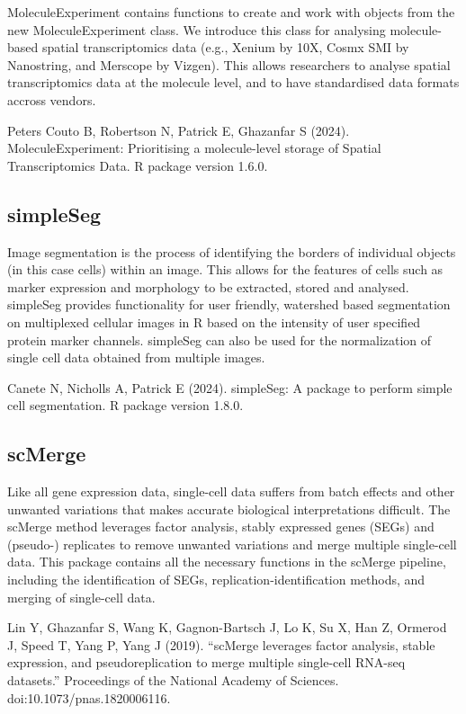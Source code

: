 \documentclass[
  letterpaper,
  DIV=11,
  numbers=noendperiod]{scrreprt}
\begin{document}
MoleculeExperiment contains functions to create and work with objects
from the new MoleculeExperiment class. We introduce this class for
analysing molecule-based spatial transcriptomics data (e.g., Xenium by
10X, Cosmx SMI by Nanostring, and Merscope by Vizgen). This allows
researchers to analyse spatial transcriptomics data at the molecule
level, and to have standardised data formats accross vendors.

Peters Couto B, Robertson N, Patrick E, Ghazanfar S (2024).
MoleculeExperiment: Prioritising a molecule-level storage of Spatial
Transcriptomics Data. R package version 1.6.0.

\subsection*{simpleSeg}\label{simpleseg}

Image segmentation is the process of identifying the borders of
individual objects (in this case cells) within an image. This allows for
the features of cells such as marker expression and morphology to be
extracted, stored and analysed. simpleSeg provides functionality for
user friendly, watershed based segmentation on multiplexed cellular
images in R based on the intensity of user specified protein marker
channels. simpleSeg can also be used for the normalization of single
cell data obtained from multiple images.

Canete N, Nicholls A, Patrick E (2024). simpleSeg: A package to perform
simple cell segmentation. R package version 1.8.0.

\subsection*{scMerge}\label{scmerge}

Like all gene expression data, single-cell data suffers from batch
effects and other unwanted variations that makes accurate biological
interpretations difficult. The scMerge method leverages factor analysis,
stably expressed genes (SEGs) and (pseudo-) replicates to remove
unwanted variations and merge multiple single-cell data. This package
contains all the necessary functions in the scMerge pipeline, including
the identification of SEGs, replication-identification methods, and
merging of single-cell data.

Lin Y, Ghazanfar S, Wang K, Gagnon-Bartsch J, Lo K, Su X, Han Z, Ormerod
J, Speed T, Yang P, Yang J (2019). ``scMerge leverages factor analysis,
stable expression, and pseudoreplication to merge multiple single-cell
RNA-seq datasets.'' Proceedings of the National Academy of Sciences.
doi:10.1073/pnas.1820006116.
\end{document}
